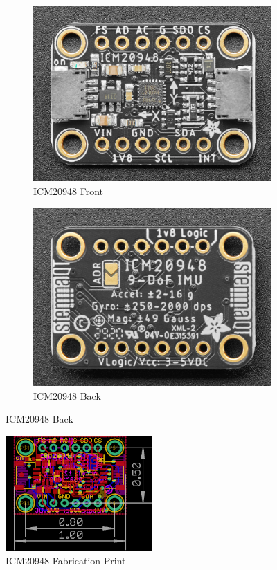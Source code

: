 \documentclass[11pt, oneside]{article}   	%
\begin{document}
\begin{figure}[ht]
\centering
\begin{subfigure}[b]{0.45\textwidth}
\includegraphics[width=\textwidth]{imgs/icm20948-front.png}
\caption{ICM20948 Front}
\end{subfigure}
\begin{subfigure}[b]{0.45\textwidth}
\includegraphics[width=\textwidth]{imgs/icm20948-back.png}
\caption{ICM20948 Back}
\end{subfigure}
\end{figure}


\begin{figure}[ht]
\centering
\includegraphics[width=0.5\textwidth]{imgs/icm20948_fab_print.png}
\caption{ICM20948 Fabrication Print}
\end{figure}
\end{document}
